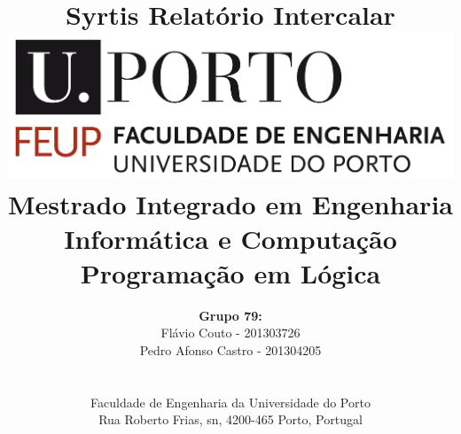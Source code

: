 \documentclass[a4paper]{article}
\begin{document}
\setlength{\textwidth}{16cm}
\setlength{\textheight}{22cm}

\title{\Huge\textbf{Syrtis}\linebreak\linebreak\linebreak
\Large\textbf{Relatório Intercalar}\linebreak\linebreak
\linebreak\linebreak
\includegraphics[scale=0.1]{feup-logo.png}\linebreak\linebreak
\linebreak\linebreak
\Large{Mestrado Integrado em Engenharia Informática e Computação} \linebreak\linebreak
\Large{Programação em Lógica}\linebreak
}

\author{\textbf{Grupo 79:}\\
Flávio Couto - 201303726 \\
Pedro Afonso Castro - 201304205 \\
\linebreak\linebreak \\
 \\ Faculdade de Engenharia da Universidade do Porto \\ Rua Roberto Frias, s\/n, 4200-465 Porto, Portugal \linebreak\linebreak\linebreak
\linebreak\linebreak\vspace{1cm}}

\maketitle
\thispagestyle{empty}
\end{document}
